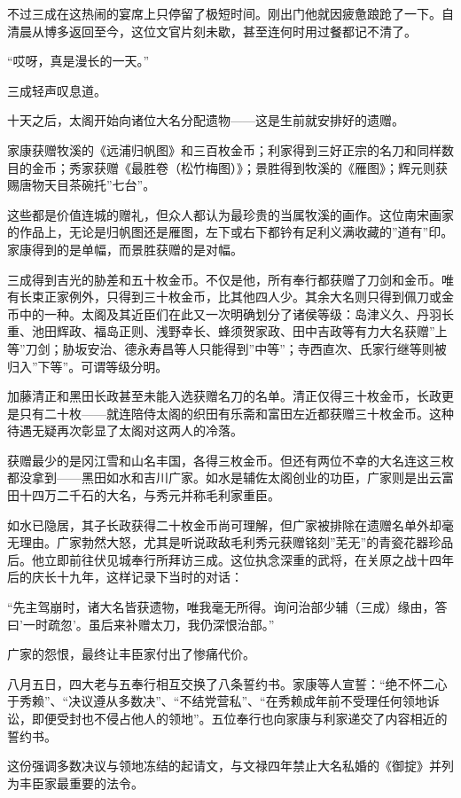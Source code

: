 \documentclass[
]{book}
\begin{document}
不过三成在这热闹的宴席上只停留了极短时间。刚出门他就因疲惫踉跄了一下。自清晨从博多返回至今，这位文官片刻未歇，甚至连何时用过餐都记不清了。

``哎呀，真是漫长的一天。''

三成轻声叹息道。

十天之后，太阁开始向诸位大名分配遗物------这是生前就安排好的遗赠。

家康获赠牧溪的《远浦归帆图》和三百枚金币；利家得到三好正宗的名刀和同样数目的金币；秀家获赠《最胜卷（松竹梅图）》；景胜得到牧溪的《雁图》；辉元则获赐唐物天目茶碗托''七台''。

这些都是价值连城的赠礼，但众人都认为最珍贵的当属牧溪的画作。这位南宋画家的作品上，无论是归帆图还是雁图，左下或右下都钤有足利义满收藏的''道有''印。家康得到的是单幅，而景胜获赠的是对幅。

三成得到吉光的胁差和五十枚金币。不仅是他，所有奉行都获赠了刀剑和金币。唯有长束正家例外，只得到三十枚金币，比其他四人少。其余大名则只得到佩刀或金币中的一种。太阁及其近臣们在此又一次明确划分了诸侯等级：岛津义久、丹羽长重、池田辉政、福岛正则、浅野幸长、蜂须贺家政、田中吉政等有力大名获赠''上等''刀剑；胁坂安治、德永寿昌等人只能得到''中等''；寺西直次、氏家行继等则被归入''下等''。可谓等级分明。

加藤清正和黑田长政甚至未能入选获赠名刀的名单。清正仅得三十枚金币，长政更是只有二十枚------就连陪侍太阁的织田有乐斋和富田左近都获赠三十枚金币。这种待遇无疑再次彰显了太阁对这两人的冷落。

获赠最少的是冈江雪和山名丰国，各得三枚金币。但还有两位不幸的大名连这三枚都没拿到------黑田如水和吉川广家。如水是辅佐太阁创业的功臣，广家则是出云富田十四万二千石的大名，与秀元并称毛利家重臣。

如水已隐居，其子长政获得二十枚金币尚可理解，但广家被排除在遗赠名单外却毫无理由。广家勃然大怒，尤其是听说政敌毛利秀元获赠铭刻''芜无''的青瓷花器珍品后。他立即前往伏见城奉行所拜访三成。这位执念深重的武将，在关原之战十四年后的庆长十九年，这样记录下当时的对话：

``先主驾崩时，诸大名皆获遗物，唯我毫无所得。询问治部少辅（三成）缘由，答曰'一时疏忽'。虽后来补赠太刀，我仍深恨治部。''

广家的怨恨，最终让丰臣家付出了惨痛代价。

八月五日，四大老与五奉行相互交换了八条誓约书。家康等人宣誓：``绝不怀二心于秀赖''、``决议遵从多数决''、``不结党营私''、``在秀赖成年前不受理任何领地诉讼，即便受封也不侵占他人的领地''。五位奉行也向家康与利家递交了内容相近的誓约书。

这份强调多数决议与领地冻结的起请文，与文禄四年禁止大名私婚的《御掟》并列为丰臣家最重要的法令。
\end{document}
